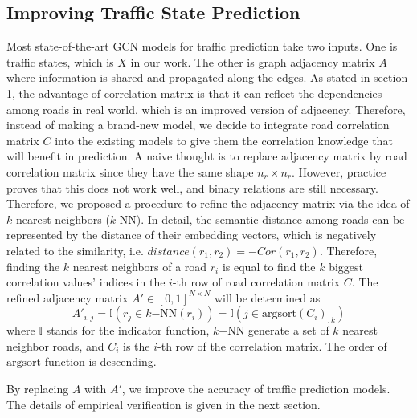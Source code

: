 \subsection{Improving Traffic State Prediction}
Most state-of-the-art GCN models for traffic prediction take two inputs. One is traffic states, which is $X$ in our work. The other is graph adjacency matrix $A$ where information is shared and propagated along the edges. As stated in section 1, the advantage of correlation matrix is that it can reflect the dependencies among roads in real world, which is an improved version of adjacency. Therefore, instead of making a brand-new model, we decide to integrate road correlation matrix $C$ into the existing models to give them the correlation knowledge that will benefit in prediction. A naive thought is to replace adjacency matrix by road correlation matrix since they have the same shape $n_r\times n_r$. However, practice proves that this does not work well, and binary relations are still necessary. Therefore, we proposed a procedure to refine the adjacency matrix via the idea of $k$-nearest neighbors ($k$-NN)\cite{knn}. In detail, the semantic distance among roads can be represented by the distance of their embedding vectors, which is negatively related to the similarity, i.e. $distance(r_1, r_2)=-Cor(r_1, r_2)$. Therefore, finding the $k$ nearest neighbors of a road $r_i$ is equal to find the $k$ biggest correlation values' indices in the $i$-th row of road correlation matrix $C$. The refined adjacency matrix $A'\in[0, 1]^{N\times N}$ will be determined as
\begin{equation}
    A'_{i, j}=\mathbb{I}(r_j\in k\mathrm{-NN}(r_i))=\mathbb{I}(j\in \mathrm{argsort}(C_i)_{:k})
\end{equation}
where $\mathbb{I}$ stands for the indicator function, $k\mathrm{-NN}$ generate a set of $k$ nearest neighbor roads, and $C_i$ is the $i$-th row of the correlation matrix. The order of $\mathrm{argsort}$ function is descending.

By replacing $A$ with $A'$, we improve the accuracy of traffic prediction models. The details of empirical verification is given in the next section.
